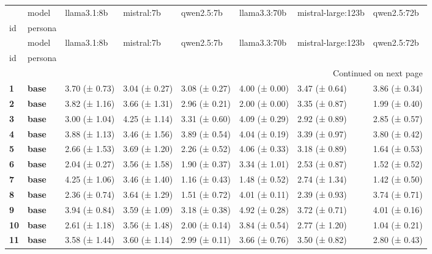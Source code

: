 \begin{longtable}{llllllll}
\toprule
 & model & llama3.1:8b & mistral:7b & qwen2.5:7b & llama3.3:70b & mistral-large:123b & qwen2.5:72b \\
id & persona &  &  &  &  &  &  \\
\midrule
\endfirsthead
\toprule
 & model & llama3.1:8b & mistral:7b & qwen2.5:7b & llama3.3:70b & mistral-large:123b & qwen2.5:72b \\
id & persona &  &  &  &  &  &  \\
\midrule
\endhead
\midrule
\multicolumn{8}{r}{Continued on next page} \\
\midrule
\endfoot
\bottomrule
\endlastfoot
\textbf{1} & \textbf{base} & 3.70 (± 0.73) & 3.04 (± 0.27) & 3.08 (± 0.27) & 4.00 (± 0.00) & 3.47 (± 0.64) & 3.86 (± 0.34) \\
\cline{1-8}
\textbf{2} & \textbf{base} & 3.82 (± 1.16) & 3.66 (± 1.31) & 2.96 (± 0.21) & 2.00 (± 0.00) & 3.35 (± 0.87) & 1.99 (± 0.40) \\
\cline{1-8}
\textbf{3} & \textbf{base} & 3.00 (± 1.04) & 4.25 (± 1.14) & 3.31 (± 0.60) & 4.09 (± 0.29) & 2.92 (± 0.89) & 2.85 (± 0.57) \\
\cline{1-8}
\textbf{4} & \textbf{base} & 3.88 (± 1.13) & 3.46 (± 1.56) & 3.89 (± 0.54) & 4.04 (± 0.19) & 3.39 (± 0.97) & 3.80 (± 0.42) \\
\cline{1-8}
\textbf{5} & \textbf{base} & 2.66 (± 1.53) & 3.69 (± 1.20) & 2.26 (± 0.52) & 4.06 (± 0.33) & 3.18 (± 0.89) & 1.64 (± 0.53) \\
\cline{1-8}
\textbf{6} & \textbf{base} & 2.04 (± 0.27) & 3.56 (± 1.58) & 1.90 (± 0.37) & 3.34 (± 1.01) & 2.53 (± 0.87) & 1.52 (± 0.52) \\
\cline{1-8}
\textbf{7} & \textbf{base} & 4.25 (± 1.06) & 3.46 (± 1.40) & 1.16 (± 0.43) & 1.48 (± 0.52) & 2.74 (± 1.34) & 1.42 (± 0.50) \\
\cline{1-8}
\textbf{8} & \textbf{base} & 2.36 (± 0.74) & 3.64 (± 1.29) & 1.51 (± 0.72) & 4.01 (± 0.11) & 2.39 (± 0.93) & 3.74 (± 0.71) \\
\cline{1-8}
\textbf{9} & \textbf{base} & 3.94 (± 0.84) & 3.59 (± 1.09) & 3.18 (± 0.38) & 4.92 (± 0.28) & 3.72 (± 0.71) & 4.01 (± 0.16) \\
\cline{1-8}
\textbf{10} & \textbf{base} & 2.61 (± 1.18) & 3.56 (± 1.48) & 2.00 (± 0.14) & 3.84 (± 0.54) & 2.77 (± 1.20) & 1.04 (± 0.21) \\
\cline{1-8}
\textbf{11} & \textbf{base} & 3.58 (± 1.44) & 3.60 (± 1.14) & 2.99 (± 0.11) & 3.66 (± 0.76) & 3.50 (± 0.82) & 2.80 (± 0.43) \\

\end{longtable}
